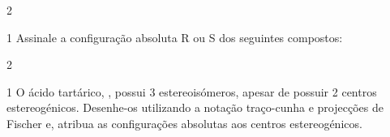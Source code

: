 \documentclass[\mainfilename]{subfiles}
\begin{document}
\begin{questionBox}2{ %
} %
    
    \begin{center}
    \end{center}

\end{questionBox}

\setcounter{question}{3}

\begin{questionBox}1{ %
    Assinale a configuração absoluta R ou S dos seguintes compostos:
} %
    

\end{questionBox}

\begin{questionBox}2{ %
} %

    \begin{center}
    \end{center}

\end{questionBox}

\begin{questionBox}1{ %
    O ácido tartárico, , possui 3 estereoisómeros, apesar de possuir 2 centros estereogénicos. Desenhe-os utilizando a notação traço-cunha e projecções de Fischer e, atribua as configurações absolutas aos centros estereogénicos.
} %
    

    \begin{center}
    \end{center}

\end{questionBox}
\end{document}
